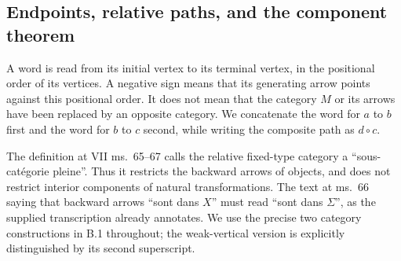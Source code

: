 \subsection{Endpoints, relative paths, and the component theorem}

A word is read from its initial vertex to its terminal vertex, in the positional order of its vertices. A negative sign means that its generating arrow points against this positional order. It does not mean that the category $M$ or its arrows have been replaced by an opposite category. We concatenate the word for $a$ to $b$ first and the word for $b$ to $c$ second, while writing the composite path as $d\circ c$.

The definition at VII ms.~65--67 calls the relative fixed-type category a ``sous-cat\'egorie pleine''. Thus it restricts the backward arrows of objects, and does not restrict interior components of natural transformations. The text at ms.~66 saying that backward arrows ``sont dans $X$'' must read ``sont dans $\Sigma$'', as the supplied transcription already annotates. We use the precise two category constructions in B.1 throughout; the weak-vertical version is explicitly distinguished by its second superscript.

